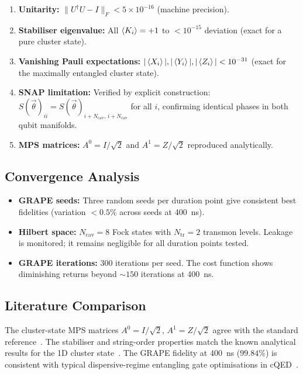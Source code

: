 \documentclass[aps,pra,twocolumn,reprint,floatfix,amsmath,amssymb]{revtex4-2}
\begin{document}
\begin{enumerate}
  \item \textbf{Unitarity:}
    $\|U^\dagger U-I\|_F<5\times10^{-16}$ (machine precision).
  \item \textbf{Stabiliser eigenvalue:}
    All $\braket{K_i}=+1$ to $<10^{-15}$ deviation
    (exact for a pure cluster state).
  \item \textbf{Vanishing Pauli expectations:}
    $|\braket{X_i}|,|\braket{Y_i}|,|\braket{Z_i}|<10^{-31}$
    (exact for the maximally entangled cluster state).
  \item \textbf{SNAP limitation:}
    Verified by explicit construction:
    $S(\vec\theta)_{ii}=S(\vec\theta)_{i+N_\mathrm{cav},\,i+N_\mathrm{cav}}$
    for all $i$, confirming identical phases in both qubit manifolds.
  \item \textbf{MPS matrices:}
    $A^0=I/\sqrt{2}$ and $A^1=Z/\sqrt{2}$ reproduced analytically.
\end{enumerate}

\subsection{Convergence Analysis}

\begin{itemize}
  \item \textbf{GRAPE seeds:} Three random seeds per duration point
    give consistent best fidelities (variation $<0.5\%$ across seeds
    at \SI{400}{ns}).
  \item \textbf{Hilbert space:} $N_\mathrm{cav}=8$ Fock states with
    $N_\mathrm{tr}=2$ transmon levels.  Leakage is monitored; it
    remains negligible for all duration points tested.
  \item \textbf{GRAPE iterations:} 300 iterations per seed.  The cost
    function shows diminishing returns beyond $\sim150$ iterations at
    \SI{400}{ns}.
\end{itemize}

\subsection{Literature Comparison}

The cluster-state MPS matrices
$A^0=I/\sqrt{2}$, $A^1=Z/\sqrt{2}$ agree with the standard
reference~\cite{perez2007matrix}.
The stabiliser and string-order properties match the known
analytical results for the 1D cluster
state~\cite{briegel2001persistent,pollmann2012detection}.
The GRAPE fidelity at \SI{400}{ns} ($99.84\%$) is consistent with
typical dispersive-regime entangling gate optimisations in
cQED~\cite{sivak2023real,eickbusch2022fast}.
\end{document}
